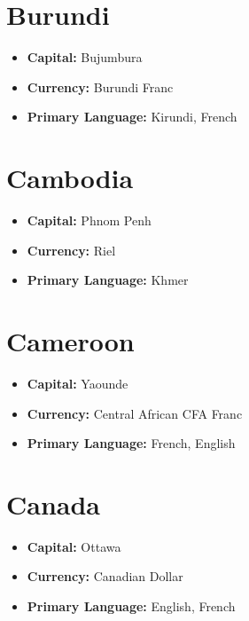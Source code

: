 \documentclass[a4paper,100pt,twoside]{book}
\begin{document}
\section*{\Huge Burundi}
\vspace{5mm} %
\begin{itemize}
	\item \textbf{Capital:} Bujumbura
	\item \textbf{Currency:} Burundi Franc
	\item \textbf{Primary Language:} Kirundi, French
\end{itemize}

\section*{\Huge Cambodia}
\vspace{5mm} %
\begin{itemize}
	\item \textbf{Capital:} Phnom Penh
	\item \textbf{Currency:} Riel
	\item \textbf{Primary Language:} Khmer
\end{itemize}

\section*{\Huge Cameroon}
\vspace{5mm} %
\begin{itemize}
	\item \textbf{Capital:} Yaounde
	\item \textbf{Currency:} Central African CFA Franc
	\item \textbf{Primary Language:} French, English
\end{itemize}

\section*{\Huge Canada}
\vspace{5mm} %
\begin{itemize}
	\item \textbf{Capital:} Ottawa
	\item \textbf{Currency:} Canadian Dollar
	\item \textbf{Primary Language:} English, French
\end{itemize}
\end{document}
